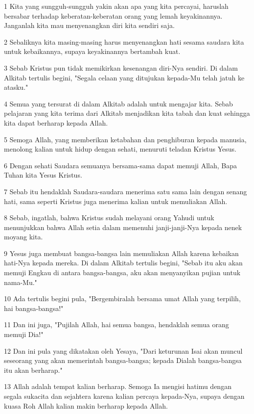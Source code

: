 \par 1 Kita yang sungguh-sungguh yakin akan apa yang kita percayai, haruslah bersabar terhadap keberatan-keberatan orang yang lemah keyakinannya. Janganlah kita mau menyenangkan diri kita sendiri saja.
\par 2 Sebaliknya kita masing-masing harus menyenangkan hati sesama saudara kita untuk kebaikannya, supaya keyakinannya bertambah kuat.
\par 3 Sebab Kristus pun tidak memikirkan kesenangan diri-Nya sendiri. Di dalam Alkitab tertulis begini, "Segala celaan yang ditujukan kepada-Mu telah jatuh ke atasku."
\par 4 Semua yang tersurat di dalam Alkitab adalah untuk mengajar kita. Sebab pelajaran yang kita terima dari Alkitab menjadikan kita tabah dan kuat sehingga kita dapat berharap kepada Allah.
\par 5 Semoga Allah, yang memberikan ketabahan dan penghiburan kepada manusia, menolong kalian untuk hidup dengan sehati, menuruti teladan Kristus Yesus.
\par 6 Dengan sehati Saudara semuanya bersama-sama dapat memuji Allah, Bapa Tuhan kita Yesus Kristus.
\par 7 Sebab itu hendaklah Saudara-saudara menerima satu sama lain dengan senang hati, sama seperti Kristus juga menerima kalian untuk memuliakan Allah.
\par 8 Sebab, ingatlah, bahwa Kristus sudah melayani orang Yahudi untuk menunjukkan bahwa Allah setia dalam memenuhi janji-janji-Nya kepada nenek moyang kita.
\par 9 Yesus juga membuat bangsa-bangsa lain memuliakan Allah karena kebaikan hati-Nya kepada mereka. Di dalam Alkitab tertulis begini, "Sebab itu aku akan memuji Engkau di antara bangsa-bangsa, aku akan menyanyikan pujian untuk nama-Mu."
\par 10 Ada tertulis begini pula, "Bergembiralah bersama umat Allah yang terpilih, hai bangsa-bangsa!"
\par 11 Dan ini juga, "Pujilah Allah, hai semua bangsa, hendaklah semua orang memuji Dia!"
\par 12 Dan ini pula yang dikatakan oleh Yesaya, "Dari keturunan Isai akan muncul seseorang yang akan memerintah bangsa-bangsa; kepada Dialah bangsa-bangsa itu akan berharap."
\par 13 Allah adalah tempat kalian berharap. Semoga Ia mengisi hatimu dengan segala sukacita dan sejahtera karena kalian percaya kepada-Nya, supaya dengan kuasa Roh Allah kalian makin berharap kepada Allah.
